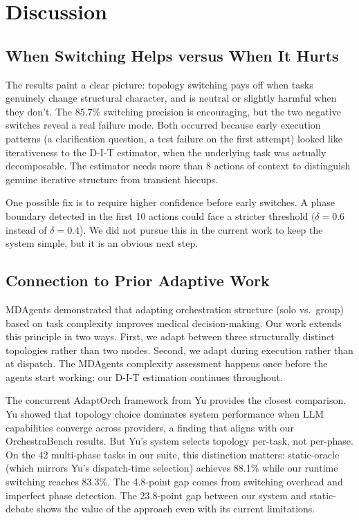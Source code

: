 \section{Discussion}\label{discussion}

\subsection{When Switching Helps versus When It
Hurts}\label{when-switching-helps-versus-when-it-hurts}

The results paint a clear picture: topology switching pays off when
tasks genuinely change structural character, and is neutral or slightly
harmful when they don't. The 85.7\% switching precision is encouraging,
but the two negative switches reveal a real failure mode. Both occurred
because early execution patterns (a clarification question, a test
failure on the first attempt) looked like iterativeness to the D-I-T
estimator, when the underlying task was actually decomposable. The
estimator needs more than 8 actions of context to distinguish genuine
iterative structure from transient hiccups.

One possible fix is to require higher confidence before early switches.
A phase boundary detected in the first 10 actions could face a stricter
threshold (\(\delta = 0.6\) instead of \(\delta = 0.4\)). We did not
pursue this in the current work to keep the system simple, but it is an
obvious next step.

\subsection{Connection to Prior Adaptive
Work}\label{connection-to-prior-adaptive-work}

MDAgents \citep{kim_2024} demonstrated that adapting orchestration
structure (solo vs.~group) based on task complexity improves medical
decision-making. Our work extends this principle in two ways. First, we
adapt between three structurally distinct topologies rather than two
modes. Second, we adapt during execution rather than at dispatch. The
MDAgents complexity assessment happens once before the agents start
working; our D-I-T estimation continues throughout.

The concurrent AdaptOrch framework from Yu \citep{adaptorch_2026}
provides the closest comparison. Yu showed that topology choice
dominates system performance when LLM capabilities converge across
providers, a finding that aligns with our OrchestraBench results. But
Yu's system selects topology per-task, not per-phase. On the 42
multi-phase tasks in our suite, this distinction matters: static-oracle
(which mirrors Yu's dispatch-time selection) achieves 88.1\% while our
runtime switching reaches 83.3\%. The 4.8-point gap comes from switching
overhead and imperfect phase detection. The 23.8-point gap between our
system and static-debate shows the value of the approach even with its
current limitations.

